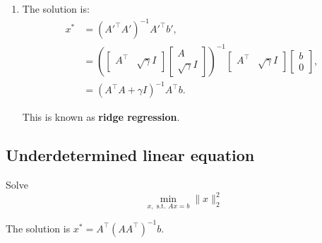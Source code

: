 \begin{example}
\begin{enumerate}
        \item The solution is:
        \begin{align*}
        x^* 
        &= (A'^\top A')^{-1} A'^\top b', \\
        &= \left(
        \begin{bmatrix}
        A^\top & \sqrt{\gamma} I
        \end{bmatrix}
        \begin{bmatrix}
        A \\ 
        \sqrt{\gamma} I
        \end{bmatrix}
        \right)^{-1}
        \begin{bmatrix}
        A^\top & \sqrt{\gamma} I
        \end{bmatrix}
        \begin{bmatrix}
        b \\ 
        0
        \end{bmatrix}, \\
        &= \left(A^\top A + \gamma I\right)^{-1} A^\top b.
        \end{align*}
        
        This is known as \textbf{ridge regression}.
    \end{enumerate}
\end{example}


\subsection{Underdetermined linear equation}
\begin{definition}
    Solve 
    \begin{equation*}
        \min_{x, \text{ s.t. } Ax=b} \|x\|_2^2
    \end{equation*}

    The solution is  $x^* = A^\top (A A^\top)^{-1} b$.
\end{definition}

